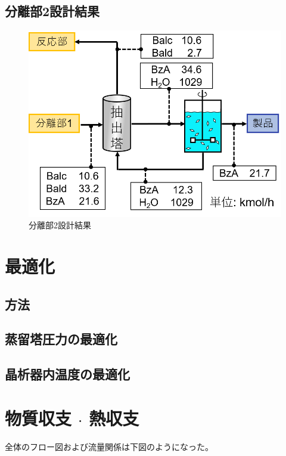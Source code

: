 \documentclass[a4j]{jsreport}
\begin{document}
\section{分離部2設計結果}
\begin{figure}[h]
    \label{分離部2設計結果}
    \begin{center}
        \includegraphics[scale=0.7]{Separion2Conclusion.png}
        \caption{分離部2設計結果}
    \end{center}
\end{figure}

\newpage
\chapter{最適化}
\section{方法}

\section{蒸留塔圧力の最適化}

\section{晶析器内温度の最適化}

\newpage
\chapter{物質収支 $\cdot$ 熱収支}
全体のフロー図および流量関係は下図のようになった。
\end{document}
